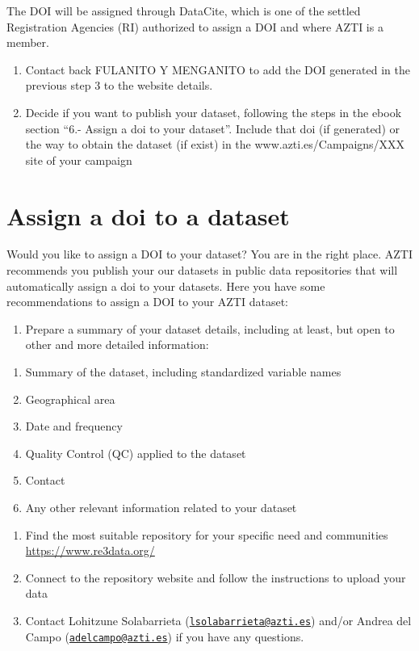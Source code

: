 \documentclass[
]{book}
\providecommand{\tightlist}{%
  \setlength{\itemsep}{0pt}\setlength{\parskip}{0pt}}
\begin{document}
The DOI will be assigned through DataCite, which is one of the settled Registration Agencies (RI) authorized to assign a DOI and where AZTI is a member.

\begin{enumerate}
\def\labelenumi{\arabic{enumi}.}
\setcounter{enumi}{3}
\item
  Contact back FULANITO Y MENGANITO to add the DOI generated in the previous step 3 to the website details.
\item
  Decide if you want to publish your dataset, following the steps in the ebook section ``6.- Assign a doi to your dataset''. Include that doi (if generated) or the way to obtain the dataset (if exist) in the www.azti.es/Campaigns/XXX site of your campaign
\end{enumerate}

\hypertarget{assign-a-doi-to-a-dataset}{%
\chapter{Assign a doi to a dataset}\label{assign-a-doi-to-a-dataset}}

Would you like to assign a DOI to your dataset? You are in the right place.
AZTI recommends you publish your our datasets in public data repositories that will automatically assign a doi to your datasets.
Here you have some recommendations to assign a DOI to your AZTI dataset:

\begin{enumerate}
\def\labelenumi{\arabic{enumi}.}
\tightlist
\item
  Prepare a summary of your dataset details, including at least, but open to other and more detailed information:
\end{enumerate}

\begin{enumerate}
\def\labelenumi{\alph{enumi}.}
\tightlist
\item
  Summary of the dataset, including standardized variable names
\item
  Geographical area
\item
  Date and frequency
\item
  Quality Control (QC) applied to the dataset
\item
  Contact
\item
  Any other relevant information related to your dataset
\end{enumerate}

\begin{enumerate}
\def\labelenumi{\arabic{enumi}.}
\setcounter{enumi}{1}
\item
  Find the most suitable repository for your specific need and communities \url{https://www.re3data.org/}
\item
  Connect to the repository website and follow the instructions to upload your data
\item
  Contact Lohitzune Solabarrieta (\href{mailto:lsolabarrieta@azti.es}{\nolinkurl{lsolabarrieta@azti.es}}) and/or Andrea del Campo (\href{mailto:adelcampo@azti.es}{\nolinkurl{adelcampo@azti.es}}) if you have any questions.
\end{enumerate}
\end{document}
